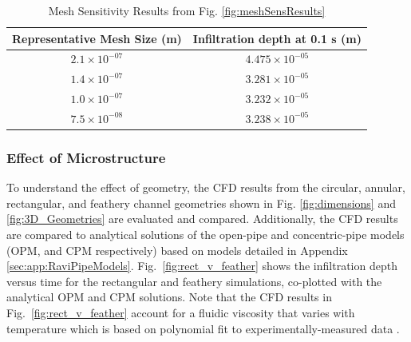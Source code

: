 \documentclass[%
 aip,
 amsmath,amssymb,
 reprint,%
]{revtex4-1}
\begin{document}
\begin{table}[htp!]
    \centering
    \caption{Mesh Sensitivity Results from Fig. \ref{fig:meshSensResults}}
    \begin{tabular}{c|c}
       Representative Mesh Size (m)  & Infiltration depth at 0.1 s (m) \\
       \hline
        $2.1\times10^{-07}$ & $4.475\times10^{-05}$ \\
        $1.4\times10^{-07}$ & $3.281\times10^{-05}$ \\
        $1.0\times10^{-07}$ & $3.232\times10^{-05}$ \\
        $7.5\times10^{-08}$ & $3.238\times10^{-05}$
    \end{tabular}
    \label{tab:meshSensResults}
\end{table}

\subsubsection{Effect of Microstructure}

To understand the effect of geometry, the CFD results from the circular, annular, rectangular, and feathery channel geometries shown in Fig. \ref{fig:dimensions} and \ref{fig:3D_Geometries} are evaluated and compared. 
Additionally, the CFD results are compared to analytical solutions of the open-pipe and concentric-pipe models (OPM, and CPM respectively) \cite{Naraparaju2019} based on models detailed in Appendix \ref{sec:app:RaviPipeModels}. 
Fig.~\ref{fig:rect_v_feather} shows the infiltration depth versus time for the rectangular and feathery simulations, co-plotted with the analytical OPM and CPM solutions. 
Note that the CFD results in Fig.~\ref{fig:rect_v_feather} account for a fluidic viscosity that varies with temperature which is based on polynomial fit to experimentally-measured data \cite{Naraparaju2017}.\\
\end{document}
